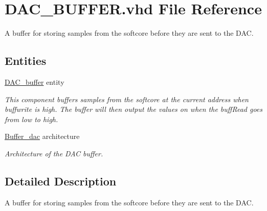\hypertarget{DAC__BUFFER_8vhd}{\section{D\-A\-C\-\_\-\-B\-U\-F\-F\-E\-R.\-vhd File Reference}
\label{DAC__BUFFER_8vhd}
}


A buffer for storing samples from the softcore before they are sent to the D\-A\-C.  


\subsection*{Entities}
\begin{DoxyCompactItemize}
\item 
\hyperlink{classDAC__buffer}{D\-A\-C\-\_\-buffer} entity
\begin{DoxyCompactList}\small\item\em This component buffers samples from the softcore at the current address when buffwrite is high. The buffer will then output the values on when the buff\-Read goes from low to high. \end{DoxyCompactList}\item 
\hyperlink{classDAC__buffer_1_1Buffer__dac}{Buffer\-\_\-dac} architecture
\begin{DoxyCompactList}\small\item\em Architecture of the D\-A\-C buffer. \end{DoxyCompactList}\end{DoxyCompactItemize}


\subsection{Detailed Description}
A buffer for storing samples from the softcore before they are sent to the D\-A\-C. 